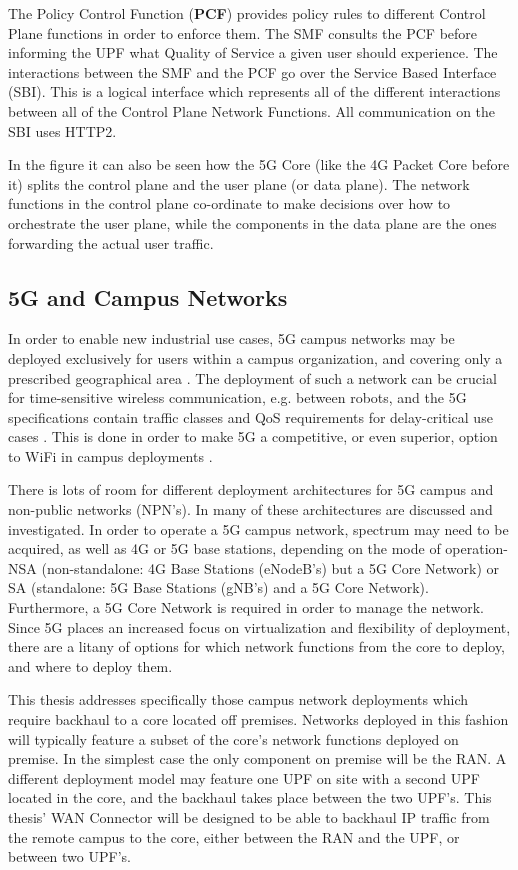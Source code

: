 The Policy Control Function (\textbf{PCF}) provides policy rules to different Control Plane functions in order to enforce them. The SMF consults the PCF before informing the UPF what Quality of Service a given user should experience. The interactions between the SMF and the PCF go over the Service Based Interface (SBI). This is a logical interface which represents all of the different interactions between all of the Control Plane Network Functions. All communication on the SBI uses HTTP2.

In the figure it can also be seen how the 5G Core (like the 4G Packet Core before it) splits the control plane and the user plane (or data plane). The network functions in the control plane co-ordinate to make decisions over how to orchestrate the user plane, while the components in the data plane are the ones forwarding the actual user traffic.

\subsection{5G and Campus Networks}

In order to enable new industrial use cases, 5G campus networks may be deployed exclusively for users within a campus organization, and covering only a prescribed geographical area \cite{rischke20215g}. The deployment of such a network can be crucial for time-sensitive wireless communication, e.g. between robots, and the 5G specifications contain traffic classes and QoS requirements for delay-critical use cases \cite{3gpp.23.501}. This is done in order to make 5G a competitive, or even superior, option to WiFi in campus deployments \cite{walia20175g}.

There is lots of room for different deployment architectures for 5G campus and non-public networks (NPN's). In \cite{prados20215g} many of these architectures are discussed and investigated. In order to operate a 5G campus network, spectrum may need to be acquired, as well as 4G or 5G base stations, depending on the mode of operation- NSA (non-standalone: 4G Base Stations (eNodeB's) but a 5G Core Network) or SA (standalone: 5G Base Stations (gNB's) and a 5G Core Network). Furthermore, a 5G Core Network is required in order to manage the network. Since 5G places an increased focus on virtualization and flexibility of deployment, there are a litany of options for which network functions from the core to deploy, and where to deploy them.

This thesis addresses specifically those campus network deployments which require backhaul to a core located off premises. Networks deployed in this fashion will typically feature a subset of the core's network functions deployed on premise. In the simplest case the only component on premise will be the RAN. A different deployment model may feature one UPF on site with a second UPF located in the core, and the backhaul takes place between the two UPF's. This thesis' WAN Connector will be designed to be able to backhaul IP traffic from the remote campus to the core, either between the RAN and the UPF, or between two UPF's.


